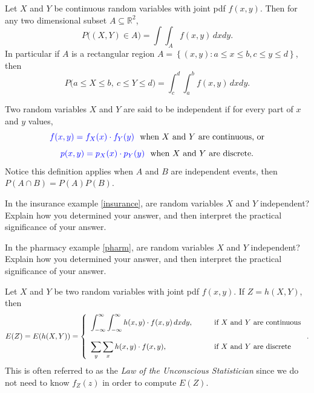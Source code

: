 \clearpage


\bbox
Let $X$ and $Y$ be continuous random variables with joint pdf $f(x,y)$.
Then for any two dimensional subset $A \subseteq \mathbb{R}^2$,
\[ P\big( (X,Y) \in A \big) = \int \int_A f(x,y) \, dx dy .\]
In particular if $A$ is a rectangular region  $A= \left\{ (x, y): a \leq x \leq b, c \leq y \leq d \right\}$, then 
\[ P\big( a \leq X \leq b, \ c \leq Y \leq d )= \int_c^d \int_a^b f(x,y) \, dx dy .\]
\ebox


\bbox
Two random variables $X$ and $Y$ are said to be \alert{independent} if for every part of $x$ and $y$ values,
\[ \textcolor{blue}{f(x,y) = f_X(x) \cdot f_Y(y)}  \ \ \mbox{when $X$ and $Y$ are continuous, or}\]
\[ \alert{p(x,y) = p_X(x) \cdot p_Y(y)}  \ \ \mbox{when $X$ and $Y$ are discrete.}\]
Notice this definition applies when $A$ and $B$ are independent events, then $P(A \cap B) = P(A)P(B)$. 
\ebox

\bb[resume]
\ii In the insurance example \ref{insurance}, are random variables $X$ and $Y$ independent? Explain how you determined your answer, and then interpret the practical significance of your answer.

\vfill

\ii In the pharmacy example \ref{pharm}, are random variables $X$ and $Y$ independent? Explain how you determined your answer, and then interpret the practical significance of your answer.

\ee

\vfill

\clearpage


\bbox

Let $X$ and $Y$ be two random variables with joint pdf $f(x,y)$. If $Z=h(X,Y)$, then
\[ E(Z) = E(h(X,Y)) = \left\{ \begin{array}{ll}
\displaystyle \int_{-\infty}^{\infty} \int_{-\infty}^{\infty} h(x,y)\cdot f(x,y) \, dx dy , \ \ \ \ \ \ & \mbox{if $X$ and $Y$ are continuous} \\
 & \\
\displaystyle \sum_y \sum_x h(x,y)\cdot f(x,y) , &  \mbox{if $X$ and $Y$ are discrete} \end{array} \right. .\]
This is often referred to as the \alert{\textit{Law of the Unconscious Statistician}} since we do not need to know $f_Z(z)$
in order to compute $E(Z)$.
\ebox

